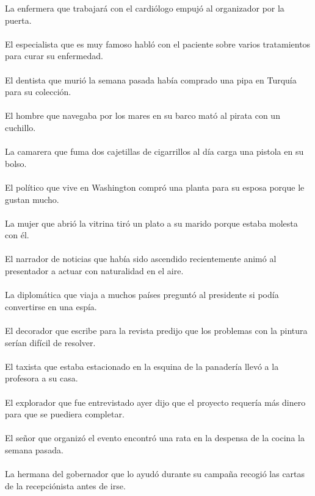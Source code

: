 La enfermera que trabajar\'{a} con el cardi\'{o}logo empuj\'{o} al organizador por la puerta.	\\	\\
El especialista que es muy famoso habl\'{o} con el paciente sobre varios tratamientos para curar su enfermedad.	\\	\\
El dentista que muri\'{o} la semana pasada hab\'{i}a comprado una pipa en Turqu\'{i}a para su colecci\'{o}n.	\\	\\
El hombre que navegaba por los mares en su barco mat\'{o} al pirata con un cuchillo.	\\	\\
La camarera que fuma dos cajetillas de cigarrillos al d\'{i}a carga una pistola en su bolso.	\\	\\
El pol\'{i}tico que vive en Washington compr\'{o} una planta para su esposa porque le gustan mucho.	\\	\\
La mujer que abri\'{o} la vitrina tir\'{o} un plato a su marido porque estaba molesta con él.	\\	\\
El narrador de noticias que hab\'{i}a sido ascendido recientemente anim\'{o} al presentador a actuar con naturalidad en el aire.	\\	\\
La diplom\'{a}tica que viaja a muchos pa\'{i}ses pregunt\'{o} al presidente si pod\'{i}a convertirse en una esp\'{i}a.	\\	\\
El decorador que escribe para la revista predijo que los problemas con la pintura ser\'{i}an dif\'{i}cil de resolver.	\\	\\
El  taxista que estaba estacionado en la esquina de la panader\'{i}a  llev\'{o} a la profesora a su casa.	\\	\\
El explorador que fue entrevistado ayer dijo que el proyecto requer\'{i}a m\'{a}s dinero para que se puediera completar.	\\	\\
El se\~{n}or que organiz\'{o} el evento encontr\'{o} una rata en la despensa de la cocina la semana pasada.	\\	\\
La hermana del gobernador que lo ayud\'{o} durante su campa\~{n}a recogi\'{o} las cartas de la recepci\'{o}nista antes de irse.	\\	\\
